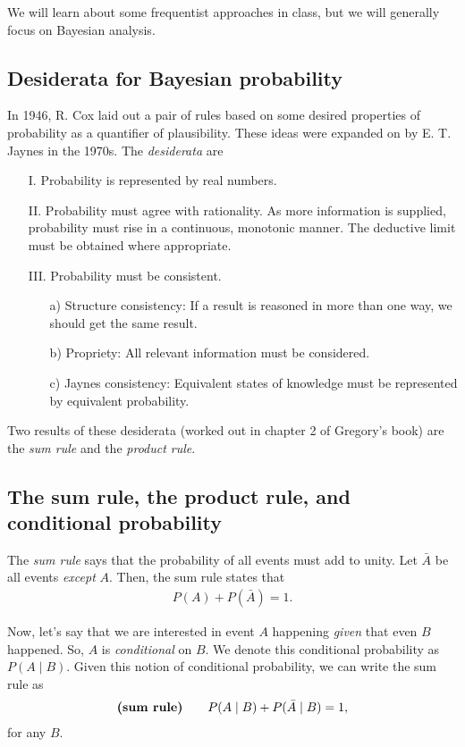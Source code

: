 We will learn about some frequentist approaches in class, but we will
generally focus on Bayesian analysis.

\subsection{Desiderata for Bayesian probability}
In 1946, R. Cox laid out a pair of rules based on some desired
properties of probability as a quantifier of plausibility.  These ideas
were expanded on by E. T. Jaynes in the 1970s.  The
\textit{desiderata} are
\begin{itemize}
\item[I.] Probability is represented by real numbers.
\item[II.] Probability must agree with rationality.  As more
  information is supplied, probability must rise in a continuous,
  monotonic manner.  The deductive limit must be obtained where
  appropriate.
\item[III.] Probability must be consistent.
  \begin{enumerate}
  \item[a)] Structure consistency: If a result is reasoned in more
    than one way, we should get the same result.
  \item[b)] Propriety: All relevant information must be considered.
  \item[c)] Jaynes consistency: Equivalent states of knowledge must be
    represented by equivalent probability.
  \end{enumerate}
\end{itemize}

Two results of these desiderata (worked out in chapter 2 of Gregory's
book) are the \textit{sum rule} and the \textit{product rule}.

\subsection{The sum rule, the product rule, and conditional probability}
The \textit{sum rule} says that the probability of all events must add
to unity.  Let $\bar{A}$ be all events \textit{except} $A$.  Then, the
sum rule states that
\begin{align}
  P(A) + P(\bar{A}) = 1.
\end{align}

Now, let's say that we are interested in event $A$ happening
\textit{given} that even $B$ happened.  So, $A$ is
\textit{conditional} on $B$.  We denote this conditional probability
as $P(A\mid B)$.  Given this notion of conditional probability, we can
write the sum rule as
\begin{align}
  \text{\textbf{(sum rule)}} \qquad P(A\mid B) + P(\bar{A} \mid B) = 1,
\end{align}
for any $B$.

